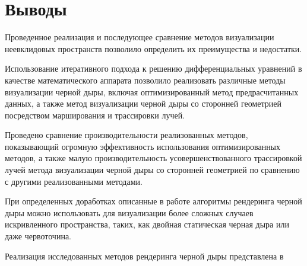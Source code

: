 \section{Выводы}
\label{sec:Chapter5} 

Проведенное реализация и последующее сравнение методов визуализации неевклидовых пространств позволило определить их преимущества и недостатки.

Использование итеративного подхода к решению дифференциальных уравнений в качестве математического аппарата позволило реализовать различные методы визуализации черной дыры, включая оптимизированный метод предрасчитанных данных, а также метод визуализации черной дыры со сторонней геометрией посредством марширования и трассировки лучей.

Проведено сравнение производительности реализованных методов, показывающий огромную эффективность использования оптимизированных методов, а также малую производительность усовершенствованного трассировкой лучей метода визуализации черной дыры со сторонней геометрией по сравнению с другими реализованными методами.

При определенных доработках описанные в работе алгоритмы рендеринга черной дыры можно использовать для визуализации более сложных случаев искривленного пространства, таких, как двойная статическая черная дыра или даже червоточина.

Реализация исследованных методов рендеринга черной дыры представлена в \cite{github}

\newpage